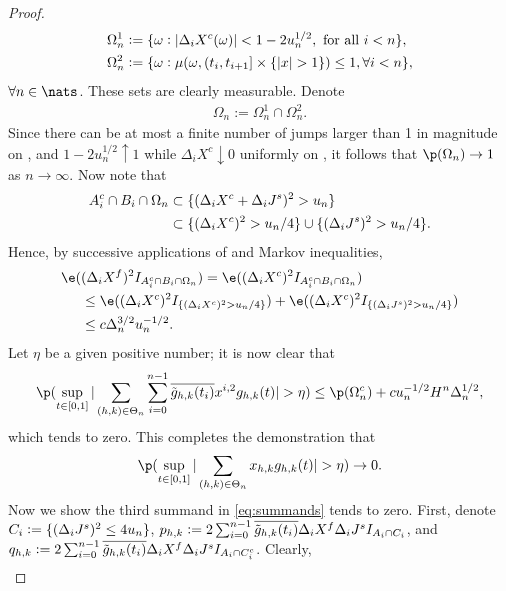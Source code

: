 \begin{proof}
\begin{align}
&\Omega_n^1 := \{ \omega: \vert\Delta_i X^c(\omega)\vert <   1-  2u_n^{1/2} , \text{ for all }i < n   \},\notag \\
&\Omega_n^2 := \{\omega : \mu(\omega,  (t_i, t_{i+1}] \times \{\vert x \vert > 1\} ) \le 1, \forall i <n  \},\notag 
\end{align}
$\forall n \in \nats$. These sets are clearly measurable. Denote 
\begin{align}
  \Omega_n   := \Omega_n^1 \cap \Omega_n^2. \label{eq:myman}
\end{align}
Since there can be at most a finite number of jumps  larger than 1  in magnitude    on \domain,  and  $1 - 2u_n^{1/2} \uparrow 1$ while $ \Delta_iX^c \downarrow  0 $  uniformly  on \domain, it follows that $ \p(\Omega_n) \to 1$ as $n \to \infty$. Now note that 
\begin{align}
  \notag
  A_i^c \cap B_i \cap \Omega_n & \subset  \{ (\Delta_i X^c + \Delta_i J^s)^2 > u_n \} \notag\\
  &\subset \{(\Delta_i X^c)^2 > u_n/4\} \cup \{(\Delta_i J^s)^2 > u_n/4\}\notag .
  \label{}
\end{align}
Hence, by successive applications of \holder and Markov inequalities,   
\begin{align}
  \notag
 \e(&(\dxf)^2 I_{A_i^c \cap B_i \cap \Omega_n} ) = \e((\dxc)^2 I_{A_i^c \cap B_i \cap \Omega_n} )\notag \\
 &\le \e((\dxc)^2 I_{\{(\dxc)^2 > u_n/4\}}) + \e((\dxc)^2 I_{\{(\djt)^2 > u_n/4\}}) \label{} \notag\\
 & \le c \Delta_n^{3/2} u_n^{-1/2}.\notag
\end{align}
Let $\eta$ be a given positive number; it is now clear that
\begin{align}
  \p(\sup_{t \in \domain} \vert \sumt\sumin  \btghki x^{i,2} \ghk(t)\vert  > \eta) \le  \p(\Omega_n^c)  + c u^{-1/2}_nH^n\Delta_n^{1/2}, \notag
  \label{}
\end{align}
which tends to zero.  This completes the demonstration that \begin{align}\label{eq:x} \p(\sup_{t \in [0,1]}\vert \sumt x_{h,k} \ghk(t) \vert > \eta) \to 0. \end{align}
Now we show the third summand in  \eqref{eq:summands} tends to zero. First, denote $C_i := \{( \Delta_i J^s )^2 \le 4 u_n\}$, $p_{h,k} : = 2 \sum_{i = 0}^{n-1} \overline{\tilde{g}_{h,k}(t_i)}\Delta_i X^f \Delta_i J^s I_{A_i \cap C_i}$, and $q_{h,k} := 2 \sum_{i = 0}^{n-1} \overline{\tilde{g}_{h,k}(t_i)}\Delta_i X^f \Delta_i J^s I_{A_i \cap C_i^c}$. Clearly, 
\begin{align} 

\end{align}
\end{proof}
